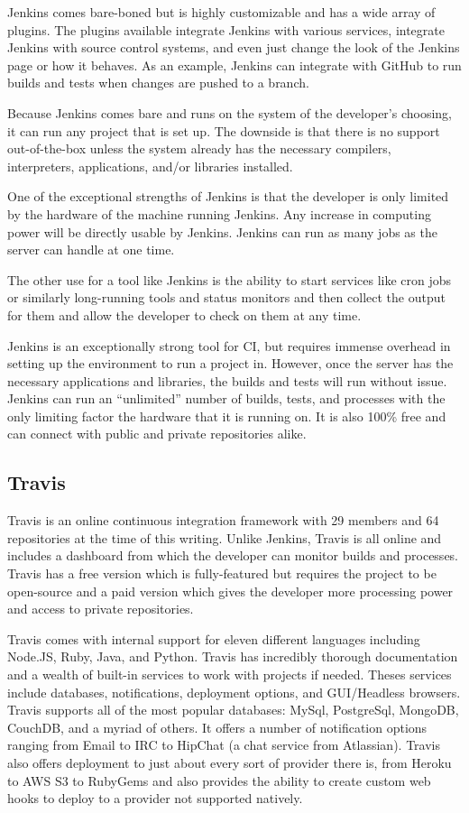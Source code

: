\documentclass[12pt]{ucthesis}
\begin{document}
Jenkins comes bare-boned but is highly customizable and has a wide array of plugins. The plugins available integrate Jenkins with various services, integrate Jenkins with source control systems, and even just change the look of the Jenkins page or how it behaves. As an example, Jenkins can integrate with GitHub to run builds and tests when changes are pushed to a branch.

Because Jenkins comes bare and runs on the system of the developer's choosing, it can run any project that is set up. The downside is that there is no support out-of-the-box unless the system already has the necessary compilers, interpreters, applications, and/or libraries installed.

One of the exceptional strengths of Jenkins is that the developer is only limited by the hardware of the machine running Jenkins. Any increase in computing power will be directly usable by Jenkins. Jenkins can run as many jobs as the server can handle at one time.

The other use for a tool like Jenkins is the ability to start services like cron jobs or similarly long-running tools and status monitors and then collect the output for them and allow the developer to check on them at any time.

Jenkins is an exceptionally strong tool for CI, but requires immense overhead in setting up the environment to run a project in. However, once the server has the necessary applications and libraries, the builds and tests will run without issue. Jenkins can run an ``unlimited'' number of builds, tests, and processes with the only limiting factor the hardware that it is running on. It is also 100\% free and can connect with public and private repositories alike.

\subsection{Travis}
Travis\cite{Travis} is an online continuous integration framework with 29 members and 64 repositories at the time of this writing. Unlike Jenkins, Travis is all online and includes a dashboard from which the developer can monitor builds and processes. Travis has a free version which is fully-featured but requires the project to be open-source and a paid version which gives the developer more processing power and access to private repositories.

Travis comes with internal support for eleven different languages including Node.JS, Ruby, Java, and Python. Travis has incredibly thorough documentation and a wealth of built-in services to work with projects if needed. Theses services include databases, notifications, deployment options, and GUI/Headless browsers. Travis supports all of the most popular databases: MySql, PostgreSql, MongoDB, CouchDB, and a myriad of others. It offers a number of notification options ranging from Email to IRC to HipChat (a chat service from Atlassian). Travis also offers deployment to just about every sort of provider there is, from Heroku to AWS S3 to RubyGems and also provides the ability to create custom web hooks to deploy to a provider not supported natively.
\end{document}
